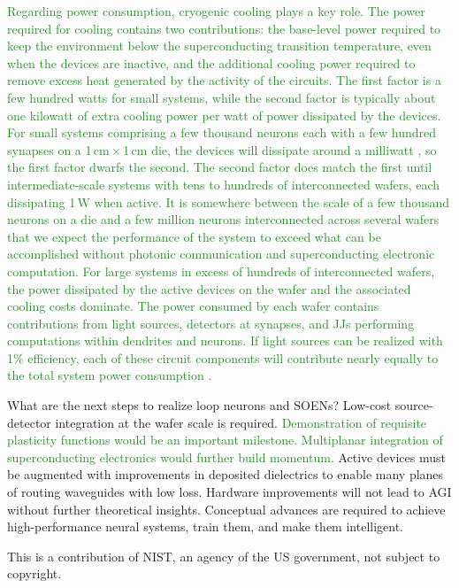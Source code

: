 \documentclass[twocolumn]{article}
\begin{document}
\textcolor{ForestGreen}{Regarding power consumption, cryogenic cooling plays a key role. The power required for cooling  contains two contributions: the base-level power required to keep the environment below the superconducting transition temperature, even when the devices are inactive, and the additional cooling power required to remove excess heat generated by the activity of the circuits. The first factor is a few hundred watts for small systems, while the second factor is typically about one kilowatt of extra cooling power per watt of power dissipated by the devices. For small systems comprising a few thousand neurons each with a few hundred synapses on a 1\,cm\,$\times$\,1\,cm die, the devices will dissipate around a milliwatt \cite{sh2019}, so the first factor dwarfs the second. The second factor does match the first until intermediate-scale systems with tens to hundreds of interconnected wafers, each dissipating 1\,W when active. It is somewhere between the scale of a few thousand neurons on a die and a few million neurons interconnected across several wafers that we expect the performance of the system to exceed what can be accomplished without photonic communication and superconducting electronic computation. For large systems in excess of hundreds of interconnected wafers, the power dissipated by the active devices on the wafer and the associated cooling costs dominate. The power consumed by each wafer contains contributions from light sources, detectors at synapses, and JJs performing computations within dendrites and neurons. If light sources can be realized with 1\% efficiency, each of these circuit components will contribute nearly equally to the total system power consumption \cite{sh2020}.}

What are the next steps to realize loop neurons and SOENs? Low-cost source-detector integration at the wafer scale is required. \textcolor{ForestGreen}{Demonstration of requisite plasticity functions would be an important milestone. Multiplanar integration of superconducting electronics would further build momentum.} Active devices must be augmented with improvements in deposited dielectrics to enable many planes of routing waveguides with low loss. Hardware improvements will not lead to AGI without further theoretical insights. Conceptual advances are required to achieve high-performance neural systems, train them, and make them intelligent.

\vspace{2em}
This is a contribution of NIST, an agency of the US government, not subject to copyright.
\end{document}
